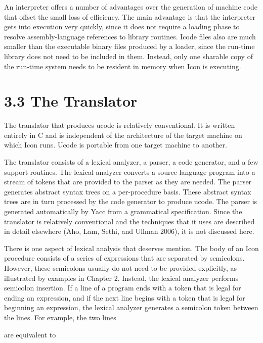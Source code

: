An interpreter offers a number of advantages over the generation of
machine code that offset the small loss of efficiency. The main
advantage is that the interpreter gets into execution very quickly,
since it does not require a loading phase to resolve assembly-language
references to library routines. Icode files also are much smaller than
the executable binary files produced by a loader, since the run-time
library does not need to be included in them. Instead, only one
sharable copy of the run-time system needs to be resident in memory
when Icon is executing.


\section[3.3 The Translator]{3.3 The Translator}

The translator that produces ucode is relatively conventional. It is
written entirely in C and is independent of the architecture of the
target machine on which Icon runs. Ucode is portable from one target
machine to another.

The translator consists of a lexical analyzer, a parser, a code
generator, and a few support routines. The lexical analyzer converts a
source-language program into a stream of tokens that are provided to
the parser as they are needed.  The parser generates abstract syntax
trees on a per-procedure basis. These abstract syntax trees are in
turn processed by the code generator to produce ucode. The parser is
generated automatically by Yacc from a grammatical specification.
Since the translator is relatively conventional and the techniques
that it uses are described in detail elsewhere (Aho, Lam, Sethi, and
Ullman 2006), it is not discussed here.

There is one aspect of lexical analysis that deserves mention. The
body of an Icon procedure consists of a series of expressions that are
separated by semicolons. However, these semicolons usually do not need
to be provided explicitly, as illustrated by examples in Chapter
2. Instead, the lexical analyzer performs semicolon insertion. If a
line of a program ends with a token that is legal for ending an
expression, and if the next line begins with a token that is legal for
beginning an expression, the lexical analyzer generates a semicolon
token between the lines. For example, the two lines


\noindent are equivalent to


